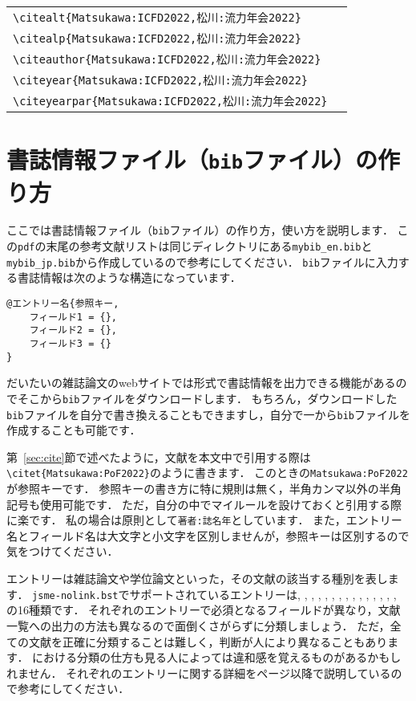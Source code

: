 \documentclass[a4paper,fleqn,uplatex,dvipdfmx]{jsarticle}
\newcommand{\jsmefile}{\texttt{jsme-nolink.bst}}
\begin{document}
\begin{table}[t]
\begin{tabular}{ll}
        \verb|\citealt{Matsukawa:ICFD2022,松川:流力年会2022}|         &\citealt{Matsukawa:ICFD2022,松川:流力年会2022} \\
        \verb|\citealp{Matsukawa:ICFD2022,松川:流力年会2022}|         &\citealp{Matsukawa:ICFD2022,松川:流力年会2022} \\
        \verb|\citeauthor{Matsukawa:ICFD2022,松川:流力年会2022}|      &\citeauthor{Matsukawa:ICFD2022,松川:流力年会2022} \\
        \verb|\citeyear{Matsukawa:ICFD2022,松川:流力年会2022}|        &\citeyear{Matsukawa:ICFD2022,松川:流力年会2022} \\
        \verb|\citeyearpar{Matsukawa:ICFD2022,松川:流力年会2022}|     &\citeyearpar{Matsukawa:ICFD2022,松川:流力年会2022}
    \end{tabular}
\end{table}


\clearpage
\section{書誌情報ファイル（\texttt{bib}ファイル）の作り方}
\label{sec:bib}
ここでは書誌情報ファイル（\texttt{bib}ファイル）の作り方，使い方を説明します．
この\verb|pdf|の末尾の参考文献リストは同じディレクトリにある\verb|mybib_en.bib|と\verb|mybib_jp.bib|から作成しているので参考にしてください．
\verb|bib|ファイルに入力する書誌情報は次のような構造になっています．
\begin{verbatim}
@エントリー名{参照キー,
    フィールド1 = {},
    フィールド2 = {},
    フィールド3 = {}
}
\end{verbatim}
だいたいの雑誌論文のwebサイトでは\BibTeX{}形式で書誌情報を出力できる機能があるのでそこから\verb|bib|ファイルをダウンロードします．
もちろん，ダウンロードした\verb|bib|ファイルを自分で書き換えることもできますし，自分で一から\verb|bib|ファイルを作成することも可能です．

第~\ref{sec:cite}節で述べたように，文献を本文中で引用する際は\verb|\citet{Matsukawa:PoF2022}|のように書きます．
このときの\verb|Matsukawa:PoF2022|が参照キーです．
参照キーの書き方に特に規則は無く，半角カンマ以外の半角記号も使用可能です．
ただ，自分の中でマイルールを設けておくと引用する際に楽です．
私の場合は原則として\texttt{\colorbox[gray]{0.8}{著者}:\colorbox[gray]{0.8}{誌名}\colorbox[gray]{0.8}{年}}としています．
また，エントリー名とフィールド名は大文字と小文字を区別しませんが，参照キーは区別するので気をつけてください．

エントリーは雑誌論文や学位論文といった，その文献の該当する種別を表します．
\jsmefile でサポートされているエントリーは\ttarticle, \ttbook, \ttbooklet, \ttcomment, \ttconference, \ttinbook, \ttincollection, \ttinproceedings, \ttmanual, \ttmastersthesis, \ttmisc, \ttonline, \ttphdthesis, \ttproceedings, \tttechreport, \ttunpublished の16種類です．
それぞれのエントリーで必須となるフィールドが異なり，文献一覧への出力の方法も異なるので面倒くさがらずに分類しましょう．
ただ，全ての文献を正確に分類することは難しく，判断が人により異なることもあります．
\JSMErepos における分類の仕方も見る人によっては違和感を覚えるものがあるかもしれません．
それぞれのエントリーに関する詳細を\pageref{ssec:article}ページ以降で説明しているので参考にしてください．
\end{document}
